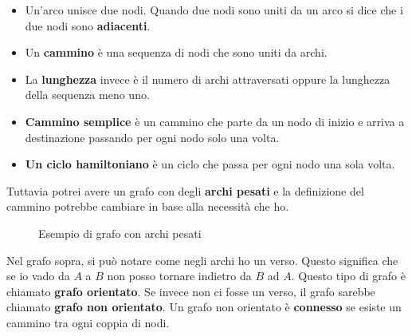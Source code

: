 \documentclass[a4paper]{article}
\begin{document}
\begin{itemize}
  \item Un'arco unisce due nodi. Quando due nodi sono uniti da un arco si dice che i due nodi sono
  \textbf{adiacenti}.
  \item  Un \textbf{cammino} è una sequenza di nodi che sono uniti da archi.
  \item  La \textbf{lunghezza} invece è il numero di archi attraversati oppure la lunghezza della sequenza
  meno uno. 
  \item \textbf{Cammino semplice} è un cammino che parte da un nodo di inizio e arriva a destinazione passando per ogni nodo solo una volta.
  \item \textbf{Un ciclo hamiltoniano} è un ciclo che passa per ogni nodo una sola volta.
\end{itemize}
Tuttavia potrei avere un grafo con degli \textbf{archi pesati} e la definizione del cammino potrebbe cambiare in base alla necessità che ho.
\begin{figure}[H]
  \centering
  \caption{Esempio di grafo con archi pesati}
\end{figure}
\noindent
Nel grafo sopra, si può notare come negli archi ho un verso. Questo significa che se io vado da $A$ a $B$ non posso tornare indietro da $B$ ad $A$.
Questo tipo di grafo è chiamato \textbf{grafo orientato}. Se invece non ci fosse un verso, il grafo sarebbe chiamato \textbf{grafo non orientato}.
Un grafo non orientato è \textbf{connesso} se esiste un cammino tra ogni coppia di nodi.

\end{document}

